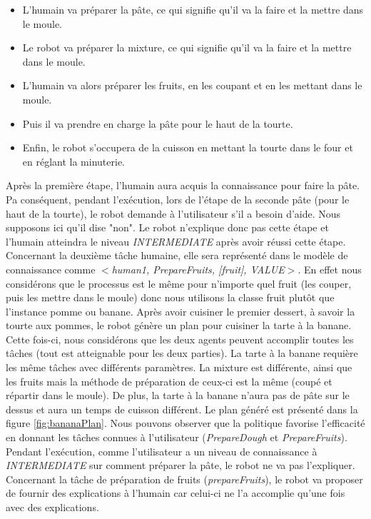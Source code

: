 \documentclass[a4paper,11pt,twoside]{StyleThese}
\begin{document}
\begin{itemize}
\item L'humain va préparer la pâte, ce qui signifie qu'il va la faire et la mettre dans le moule.
\item Le robot va préparer la mixture, ce qui signifie qu'il va la faire et la mettre dans le moule.
\item L'humain va alors préparer les fruits, en les coupant et en les mettant dans le moule.
\item Puis il va prendre en charge la pâte pour le haut de la tourte.
\item Enfin, le robot s'occupera de la cuisson en mettant la tourte dans le four et en réglant la minuterie.
\end{itemize} 

Après la première étape, l'humain aura acquis la connaissance pour faire la pâte. Pa conséquent, pendant l'exécution, lors de l'étape de la seconde pâte (pour le haut de la tourte), le robot demande à l'utilisateur s'il a besoin d'aide. Nous supposons ici qu'il dise "non". Le robot n'explique donc pas cette étape et l'humain atteindra le niveau \textit{INTERMEDIATE} après avoir réussi cette étape. Concernant la deuxième tâche humaine, elle sera représenté dans le modèle de connaissance comme \textit{$<$human1, PrepareFruits, [fruit], VALUE$>$}. En effet nous considérons que le processus est le même pour n'importe quel fruit (les couper, puis les mettre dans le moule) donc nous utilisons la classe fruit plutôt que l'instance pomme ou banane.
%
%
Après avoir cuisiner le premier dessert, à savoir la tourte aux pommes, le robot génère un plan pour cuisiner la tarte à la banane. Cette fois-ci, nous considérons que les deux agents peuvent accomplir toutes les tâches (tout est atteignable pour les deux parties). La tarte à la banane requière les même tâches avec différents paramètres. La mixture est différente, ainsi que les fruits mais la méthode de préparation de ceux-ci est la même (coupé et répartir dans le moule). De plus, la tarte à la banane n'aura pas de pâte sur le dessus et aura un temps de cuisson différent. Le plan généré est présenté dans la figure \ref{fig:bananaPlan}. Nous pouvons observer que la politique favorise l'efficacité en donnant les tâches connues à l'utilisateur (\textit{PrepareDough} et \textit{PrepareFruits}). Pendant l'exécution, comme l'utilisateur a un niveau de connaissance à \textit{INTERMEDIATE} sur comment préparer la pâte, le robot ne va pas l'expliquer. Concernant la tâche de préparation de fruits (\textit{prepareFruits}), le robot va proposer de fournir des explications à l'humain car celui-ci ne l'a accomplie qu'une fois avec des explications.
\end{document}
